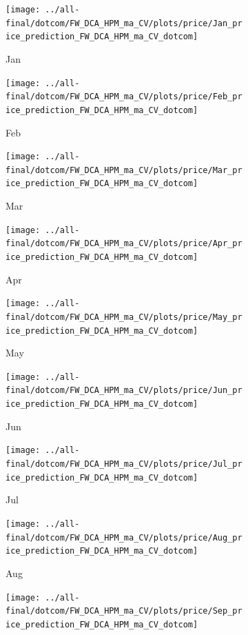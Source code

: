 \documentclass[ngerman]{ttlab-qualify}
\begin{document}
\newpage
\begin{figure}[H]
\centering
  \begin{subfigure}{.3\linewidth}
  \texttt{[image: ../all-final/dotcom/FW\_DCA\_HPM\_ma\_CV/plots/price/Jan\_price\_prediction\_FW\_DCA\_HPM\_ma\_CV\_dotcom]}\hfill
  \caption{Jan}
  \end{subfigure}
  \begin{subfigure}{.3\linewidth}
  \texttt{[image: ../all-final/dotcom/FW\_DCA\_HPM\_ma\_CV/plots/price/Feb\_price\_prediction\_FW\_DCA\_HPM\_ma\_CV\_dotcom]}\hfill
  \caption{Feb}
  \end{subfigure}
  \begin{subfigure}{.3\linewidth}
  \texttt{[image: ../all-final/dotcom/FW\_DCA\_HPM\_ma\_CV/plots/price/Mar\_price\_prediction\_FW\_DCA\_HPM\_ma\_CV\_dotcom]}\hfill
  \caption{Mar}
  \end{subfigure}\par\medskip
  \begin{subfigure}{.3\linewidth}
  \texttt{[image: ../all-final/dotcom/FW\_DCA\_HPM\_ma\_CV/plots/price/Apr\_price\_prediction\_FW\_DCA\_HPM\_ma\_CV\_dotcom]}\hfill
  \caption{Apr}
  \end{subfigure}
  \begin{subfigure}{.3\linewidth}
  \texttt{[image: ../all-final/dotcom/FW\_DCA\_HPM\_ma\_CV/plots/price/May\_price\_prediction\_FW\_DCA\_HPM\_ma\_CV\_dotcom]}\hfill
  \caption{May}
  \end{subfigure}
  \begin{subfigure}{.3\linewidth}
  \texttt{[image: ../all-final/dotcom/FW\_DCA\_HPM\_ma\_CV/plots/price/Jun\_price\_prediction\_FW\_DCA\_HPM\_ma\_CV\_dotcom]}\hfill
  \caption{Jun}
  \end{subfigure}\par\medskip
  \begin{subfigure}{.3\linewidth}
  \texttt{[image: ../all-final/dotcom/FW\_DCA\_HPM\_ma\_CV/plots/price/Jul\_price\_prediction\_FW\_DCA\_HPM\_ma\_CV\_dotcom]}\hfill
  \caption{Jul}
  \end{subfigure}
  \begin{subfigure}{.3\linewidth}
  \texttt{[image: ../all-final/dotcom/FW\_DCA\_HPM\_ma\_CV/plots/price/Aug\_price\_prediction\_FW\_DCA\_HPM\_ma\_CV\_dotcom]}\hfill
  \caption{Aug}
  \end{subfigure}
  \begin{subfigure}{.3\linewidth}
  \texttt{[image: ../all-final/dotcom/FW\_DCA\_HPM\_ma\_CV/plots/price/Sep\_price\_prediction\_FW\_DCA\_HPM\_ma\_CV\_dotcom]}\hfill

\end{subfigure}
\end{figure}
\end{document}
